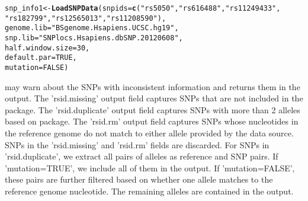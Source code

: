 \documentclass[a4paper,10pt]{article}\usepackage[]{graphicx}\usepackage[]{color}
\makeatletter
\newcommand{\hlnum}[1]{\textcolor[rgb]{0.686,0.059,0.569}{#1}}%
\newcommand{\hlstr}[1]{\textcolor[rgb]{0.192,0.494,0.8}{#1}}%
\newcommand{\hlstd}[1]{\textcolor[rgb]{0.345,0.345,0.345}{#1}}%
\newcommand{\hlkwb}[1]{\textcolor[rgb]{0.69,0.353,0.396}{#1}}%
\newcommand{\hlkwc}[1]{\textcolor[rgb]{0.333,0.667,0.333}{#1}}%
\newcommand{\hlkwd}[1]{\textcolor[rgb]{0.737,0.353,0.396}{\textbf{#1}}}%
\newenvironment{kframe}{%
 \def\at@end@of@kframe{}%
 \ifinner\ifhmode%
  \def\at@end@of@kframe{\end{minipage}}%
  \begin{minipage}{\columnwidth}%
 \fi\fi%
 \def\FrameCommand##1{\hskip\@totalleftmargin \hskip-\fboxsep
 \colorbox{shadecolor}{##1}\hskip-\fboxsep
     \hskip-\linewidth \hskip-\@totalleftmargin \hskip\columnwidth}%
 \MakeFramed {\advance\hsize-\width
   \@totalleftmargin\z@ \linewidth\hsize
   \@setminipage}}%
 {\par\unskip\endMakeFramed%
 \at@end@of@kframe}
\newenvironment{knitrout}{}{} %
\makeatother
\begin{document}
\begin{knitrout}
\color{fgcolor}\begin{kframe}
\begin{alltt}
\hlstd{snp_info1} \hlkwb{<-} \hlkwd{LoadSNPData}\hlstd{(}\hlkwc{snpids} \hlstd{=} \hlkwd{c}\hlstd{(}\hlstr{"rs5050"}\hlstd{,} \hlstr{"rs616488"}\hlstd{,} \hlstr{"rs11249433"}\hlstd{,}
                           \hlstr{"rs182799"}\hlstd{,} \hlstr{"rs12565013"}\hlstd{,} \hlstr{"rs11208590"}\hlstd{),}
                         \hlkwc{genome.lib} \hlstd{=} \hlstr{"BSgenome.Hsapiens.UCSC.hg19"}\hlstd{,}
                         \hlkwc{snp.lib} \hlstd{=} \hlstr{"SNPlocs.Hsapiens.dbSNP.20120608"}\hlstd{,}
                         \hlkwc{half.window.size} \hlstd{=} \hlnum{30}\hlstd{,}
                         \hlkwc{default.par} \hlstd{=} \hlnum{TRUE}\hlstd{,}
                         \hlkwc{mutation} \hlstd{=} \hlnum{FALSE}\hlstd{)}
\end{alltt}


{\ttfamily\noindent\itshape\color{messagecolor}{\#\# Warning: the following rsids are not included in the database and discarded: \\\#\# rs182799\\\#\# Warning: the following SNPs have more than 2 alleles. All pairs of nucleotides are considered as pairs of the SNP and the reference allele:\\\#\# rs12565013, rs11208590\\\#\# Warning: the following sequences are discarded because the reference nucleotide matches to neither a1 nor a2:\\\#\# snpid	chr	snp	a1	a2\\\#\# rs12565013	chr1	 3203137	C	T\\\#\# rs11208590	chr1	41108149	A	C}}\end{kframe}
\end{knitrout}

 may warn about the SNPs with inconsistent information and returns them in the output. The 'rsid.missing' output field captures SNPs that are not included in the  package. The 'rsid.duplicate' output field captures SNPs with more than 2 alleles based on  package. The 'rsid.rm' output field captures SNPs whose nucleotides in the reference genome do not match to either allele provided by the data source. SNPs in the 'rsid.missing' and 'rsid.rm' fields are discarded. For SNPs in 'rsid.duplicate', we extract all pairs of alleles as reference and SNP pairs. If 'mutation=TRUE', we include all of them in the output. If 'mutation=FALSE', these pairs are further filtered based on whether one allele matches to the reference genome nucleotide. The remaining alleles are contained in the output.
\end{document}
